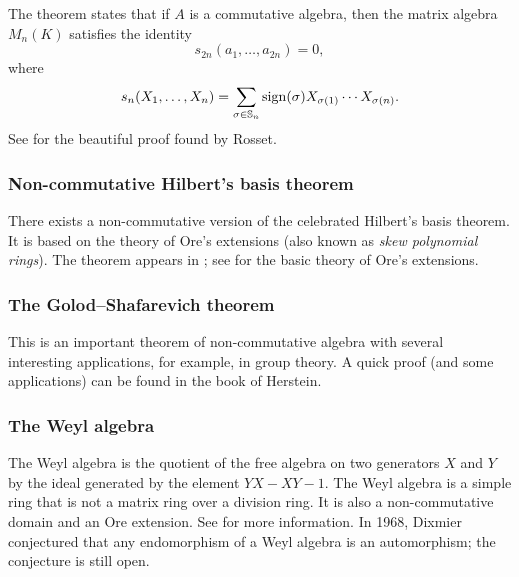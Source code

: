The theorem states that 
if $A$ is a commutative algebra, then 
the matrix algebra 
$M_n(K)$ satisfies the identity 
\[
s_{2n}(a_{1},\dots ,a_{2n})=0,
\]
where 
\[
s_{n}(X_1,\dots,X_n)=\sum_{\sigma\in\mathbb{S}_n}\operatorname{sign}(\sigma)X_{\sigma(1)}\cdots X_{\sigma(n)}.
\]
See \cite[Theorem 6.39]{MR3308118} for the beautiful 
proof found by Rosset. 

\subsubsection*{Non-commutative Hilbert's basis theorem}

There exists a non-commutative version of the celebrated
Hilbert's basis theorem. It is based on the theory of Ore's extensions (also known as \emph{skew polynomial rings}). The theorem
appears in \cite[I.8.3]{MR1321145}; see \cite[I.7]{MR1321145} 
for the basic theory of Ore's extensions. 

\subsubsection*{The Golod--Shafarevich theorem}

This is an important theorem of non-commutative algebra
with several interesting applications, for example, in group theory. 
A quick proof (and some applications) can be found in the book \cite{MR1449137} of Herstein. 



\subsubsection*{The Weyl algebra}

The Weyl algebra is the quotient of the free algebra on two generators
$X$ and $Y$ by the ideal generated by the element
$YX-XY-1$. The Weyl algebra is a simple ring that is 
not a matrix ring over a division ring. It is also a non-commutative domain and an Ore extension. See \cite{MR1838439} for more information. 
In 1968, Dixmier conjectured that any 
endomorphism of a Weyl algebra is an automorphism; the conjecture
is still open. 


